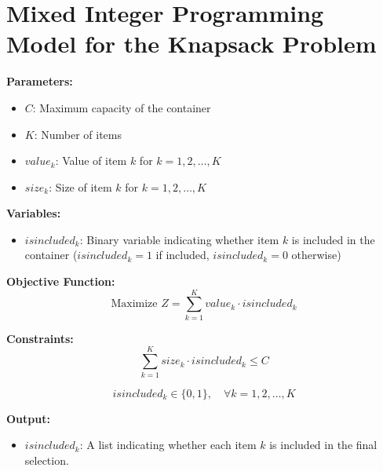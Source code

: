 \documentclass{article}
\begin{document}
\section*{Mixed Integer Programming Model for the Knapsack Problem}

\textbf{Parameters:}
\begin{itemize}
    \item $C$: Maximum capacity of the container
    \item $K$: Number of items
    \item $value_k$: Value of item $k$ for $k = 1, 2, \ldots, K$
    \item $size_k$: Size of item $k$ for $k = 1, 2, \ldots, K$
\end{itemize}

\textbf{Variables:}
\begin{itemize}
    \item $isincluded_k$: Binary variable indicating whether item $k$ is included in the container ($isincluded_k = 1$ if included, $isincluded_k = 0$ otherwise)
\end{itemize}

\textbf{Objective Function:}
\[
\text{Maximize } Z = \sum_{k=1}^{K} value_k \cdot isincluded_k
\]

\textbf{Constraints:}
\[
\sum_{k=1}^{K} size_k \cdot isincluded_k \leq C
\]

\[
isincluded_k \in \{0, 1\}, \quad \forall k = 1, 2, \ldots, K
\]

\textbf{Output:}
\begin{itemize}
    \item $isincluded_k$: A list indicating whether each item $k$ is included in the final selection.
\end{itemize}
\end{document}
